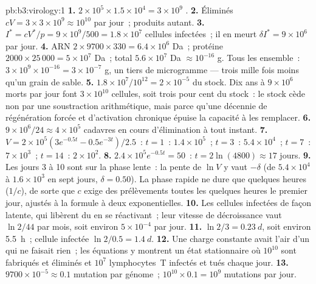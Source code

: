 \begin{solution}{pb:b3:virology:1}
\textbf{1.} $2\times 10^{5}\times 1.5\times 10^{4} = 3\times 10^{9}$
.
\textbf{2.} Éliminés $cV = 3\times 3\times 10^{9} \approx 10^{10}$ par
jour~; produits autant.
\textbf{3.} $I^{*} = cV^{*}/p = 9\times 10^{9}/500 = 1.8\times 10^{7}$
cellules infectées~; il en meurt $\delta I^{*} = 9\times 10^{6}$ par
jour.
\textbf{4.} ARN $2\times 9700\times 330 = 6.4\times 10^{6}$ Da~;
protéine $2000\times 25\,000 = 5\times 10^{7}$ Da~; total
$5.6\times 10^{7}$ Da $\approx 10^{-16}$ g. Tous les  ensemble~:
$3\times 10^{9}\times
10^{-16} = 3\times 10^{-7}$ g, un tiers de microgramme --- trois mille
fois moins qu'un grain de sable.
\textbf{5.} $1.8\times 10^{7}/10^{12} = 2\times 10^{-5}$ du stock. Dix
ans à $9\times 10^{6}$ morts par jour font $3\times 10^{10}$ cellules,
soit trois pour cent du stock~: le stock cède non par une soustraction
arithmétique, mais parce qu'une décennie de régénération forcée et
d'activation chronique épuise la capacité à les remplacer.
\textbf{6.} $9\times 10^{6}/24 \approx 4\times 10^{5}$ cadavres en cours
d'élimination à tout instant.
\textbf{7.} $V = 2\times 10^{5}(3e^{-0.5t} - 0.5e^{-3t})/2.5$~: $t = 1$~:
$1.4\times 10^{5}$~; $t = 3$~: $5.4\times 10^{4}$~; $t = 7$~: $7\times
10^{3}$~; $t = 14$~: $2\times 10^{2}$.
\textbf{8.} $2.4\times 10^{5}e^{-0.5t} = 50$~: $t = 2\ln(4800) \approx 17$
jours.
\textbf{9.} Les jours 3 à 10 sont sur la phase lente~: la pente de
$\ln V$ y vaut $-\delta$ (de $5.4\times 10^{4}$ à $1.6\times 10^{3}$ en
sept jours, $\delta = 0.50$). La phase rapide ne dure que quelques
heures ($1/c$), de sorte que $c$ exige des prélèvements toutes les
quelques heures le premier jour, ajustés à la formule à deux
exponentielles.
\textbf{10.} Les cellules infectées de façon latente, qui libèrent du
 en se réactivant~; leur vitesse de décroissance vaut $\ln 2/44$
par mois, soit environ $5\times 10^{-4}$ par jour.
\textbf{11.}  $\ln 2/3 = \qty{0.23}{d}$, soit environ
\qty{5.5}{h}~; cellule infectée $\ln 2/0.5 = \qty{1.4}{d}$.
\textbf{12.} Une charge constante avait l'air d'un  qui ne faisait
rien~; les équations y montrent un état stationnaire où $10^{10}$
 sont fabriqués et éliminés et $10^{7}$ lymphocytes~T infectés
et tués chaque jour.
\textbf{13.} $9700\times 10^{-5} \approx 0.1$ mutation par génome~;
$10^{10}\times 0.1 = 10^{9}$ mutations par jour.

\end{solution}
